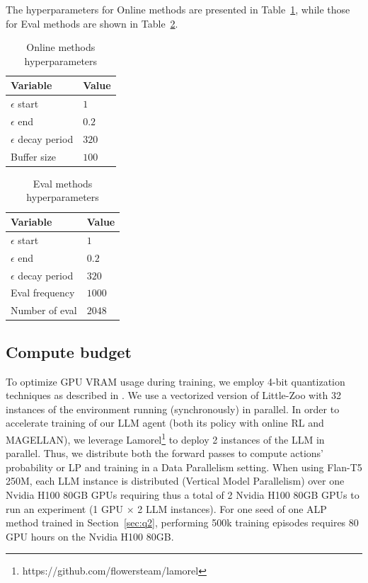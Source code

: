 The hyperparameters for Online methods are presented in Table~\ref{tab:online_param}, while those for Eval methods are shown in Table~\ref{tab:eval_param}.

\begin{table}[!ht]
    \caption{Online methods hyperparameters}
    \centering 
    \begin{tabular}{ll}
    \toprule
    \textbf{Variable} & \textbf{Value} \\
    \midrule
    $\epsilon$ start & $1$ \\
    $\epsilon$ end & $0.2$ \\
    $\epsilon$ decay period & $320$ \\
    Buffer size & $100$ \\
    \bottomrule
    \end{tabular}
    \label{tab:online_param}
\end{table}


\begin{table}[!ht]
    \caption{Eval methods hyperparameters}
    \centering 
    \begin{tabular}{ll}
    \toprule
    \textbf{Variable} & \textbf{Value} \\
    \midrule
    $\epsilon$ start & $1$ \\
    $\epsilon$ end & $0.2$ \\
    $\epsilon$ decay period & $320$ \\
    Eval frequency & $1000$ \\
    Number of eval & $2048$ \\
    \bottomrule
    \end{tabular}
    \label{tab:eval_param}
\end{table}


\subsection{Compute budget}
\label{app:compute_budget}
To optimize GPU VRAM usage during training, we employ 4-bit quantization techniques as described in \citep{Dettmers2023QLoRAEF}. We use a vectorized version of Little-Zoo with 32 instances of the environment running (synchronously) in parallel. In order to accelerate training of our LLM agent  (both its policy with online RL and MAGELLAN), we leverage Lamorel\footnote{https://github.com/flowersteam/lamorel} to deploy 2 instances of the LLM in parallel. Thus, we distribute both the forward passes to compute actions' probability or LP and training in a Data Parallelism setting. When using Flan-T5 250M, each LLM instance is distributed (Vertical Model Parallelism) over one Nvidia H100 80GB GPUs requiring thus a total of 2 Nvidia H100 80GB GPUs to run an experiment (1 GPU $\times$ 2 LLM instances). For one seed of one ALP method trained in Section~\ref{sec:q2}, performing 500k training episodes requires 80 GPU hours on the Nvidia H100 80GB.


